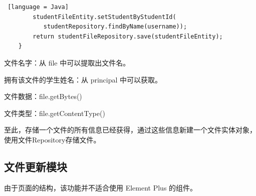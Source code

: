 \begin{itemize}
\begin{itemize}
\begin{lstlisting} [language = Java]
        studentFileEntity.setStudentByStudentId(
           studentRepository.findByName(username));
        return studentFileRepository.save(studentFileEntity);
    }
        \end{lstlisting}
                文件名字：从 file 中可以提取出文件名。

                拥有该文件的学生姓名：从 principal 中可以获取。

                文件数据：file.getBytes()

                文件类型：file.getContentType()

                至此，存储一个文件的所有信息已经获得，通过这些信息新建一个文件实体对象，使用文件Repository存储文件。
        \end{itemize}
\end{itemize}

\subsection{文件更新模块}

由于页面的结构，该功能并不适合使用 Element Plus 的组件。

